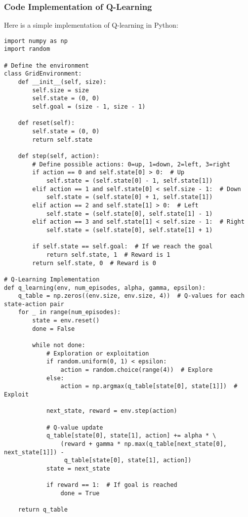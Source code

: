 \documentclass{beamer}
\begin{document}
\begin{frame}[fragile]
    \frametitle{Code Implementation of Q-Learning}
    Here is a simple implementation of Q-learning in Python:
    \begin{lstlisting}
import numpy as np
import random

# Define the environment
class GridEnvironment:
    def __init__(self, size):
        self.size = size
        self.state = (0, 0)
        self.goal = (size - 1, size - 1)
        
    def reset(self):
        self.state = (0, 0)
        return self.state

    def step(self, action):
        # Define possible actions: 0=up, 1=down, 2=left, 3=right
        if action == 0 and self.state[0] > 0:  # Up
            self.state = (self.state[0] - 1, self.state[1])
        elif action == 1 and self.state[0] < self.size - 1:  # Down
            self.state = (self.state[0] + 1, self.state[1])
        elif action == 2 and self.state[1] > 0:  # Left
            self.state = (self.state[0], self.state[1] - 1)
        elif action == 3 and self.state[1] < self.size - 1:  # Right
            self.state = (self.state[0], self.state[1] + 1)

        if self.state == self.goal:  # If we reach the goal
            return self.state, 1  # Reward is 1
        return self.state, 0  # Reward is 0

# Q-Learning Implementation
def q_learning(env, num_episodes, alpha, gamma, epsilon):
    q_table = np.zeros((env.size, env.size, 4))  # Q-values for each state-action pair
    for _ in range(num_episodes):
        state = env.reset()
        done = False
        
        while not done:
            # Exploration or exploitation
            if random.uniform(0, 1) < epsilon:
                action = random.choice(range(4))  # Explore
            else:
                action = np.argmax(q_table[state[0], state[1]])  # Exploit

            next_state, reward = env.step(action)

            # Q-value update
            q_table[state[0], state[1], action] += alpha * \
                (reward + gamma * np.max(q_table[next_state[0], next_state[1]]) - 
                 q_table[state[0], state[1], action])
            state = next_state
            
            if reward == 1:  # If goal is reached
                done = True
    
    return q_table
    \end{lstlisting}
\end{frame}
\end{document}
